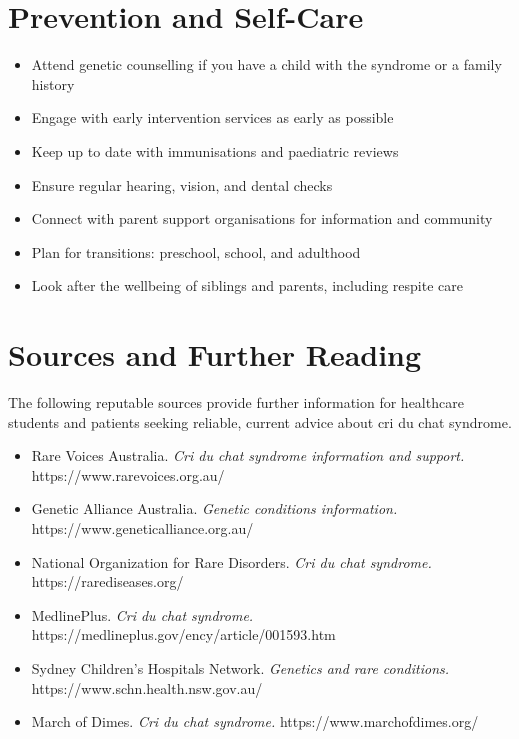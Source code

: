 \section*{Prevention and Self-Care}
\begin{itemize}
    \item Attend genetic counselling if you have a child with the syndrome or a family history
    \item Engage with early intervention services as early as possible
    \item Keep up to date with immunisations and paediatric reviews
    \item Ensure regular hearing, vision, and dental checks
    \item Connect with parent support organisations for information and community
    \item Plan for transitions: preschool, school, and adulthood
    \item Look after the wellbeing of siblings and parents, including respite care
\end{itemize}

\section*{Sources and Further Reading}
The following reputable sources provide further information for healthcare students and patients seeking reliable, current advice about cri du chat syndrome.

\begin{itemize}
    \item Rare Voices Australia. \textit{Cri du chat syndrome information and support.} https://www.rarevoices.org.au/
    \item Genetic Alliance Australia. \textit{Genetic conditions information.} https://www.geneticalliance.org.au/
    \item National Organization for Rare Disorders. \textit{Cri du chat syndrome.} https://rarediseases.org/
    \item MedlinePlus. \textit{Cri du chat syndrome.} https://medlineplus.gov/ency/article/001593.htm
    \item Sydney Children's Hospitals Network. \textit{Genetics and rare conditions.} https://www.schn.health.nsw.gov.au/
    \item March of Dimes. \textit{Cri du chat syndrome.} https://www.marchofdimes.org/
\end{itemize}
